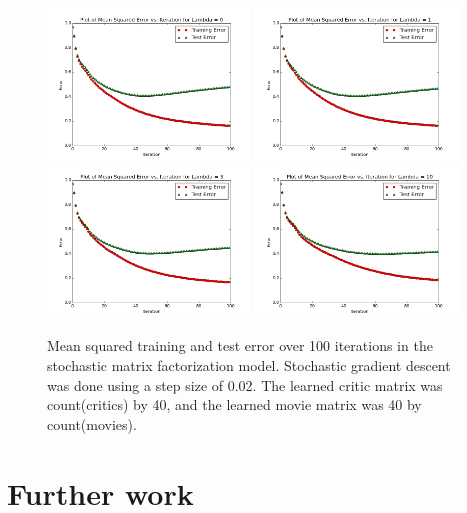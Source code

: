 \documentclass[12pt]{article}
\begin{document}
	\begin{figure}[H]
	\centering
	\includegraphics[width=0.48\textwidth]{plots/test-i100d40l0.png}
	\includegraphics[width=0.48\textwidth]{plots/test-i100d40l1.png}
	\includegraphics[width=0.48\textwidth]{plots/test-i100d40l3.png}
	\includegraphics[width=0.48\textwidth]{plots/test-i100d40l10.png}
	\caption{Mean squared training and test error over 100 iterations in the stochastic matrix factorization model. Stochastic gradient descent was done using a step size of 0.02. The learned critic matrix was count(critics) by 40, and the learned movie matrix was 40 by count(movies).}
	\label{fig:40}
	\end{figure}



\section{Further work}


{}

\end{document}
